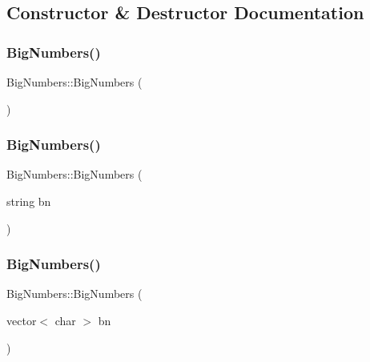\subsection{Constructor \& Destructor Documentation}
\mbox{\label{class_big_numbers_af3dd82883f10f3473ac83280f26b0ad8}} 
\subsubsection{\texorpdfstring{Big\+Numbers()}{BigNumbers()}\hspace{0.1cm}{\footnotesize\ttfamily [1/3]}}
{\footnotesize\ttfamily Big\+Numbers\+::\+Big\+Numbers (\begin{DoxyParamCaption}{ }\end{DoxyParamCaption})}

\mbox{\label{class_big_numbers_a99d3e27e38581f94c7c72a907ce83a98}} 
\subsubsection{\texorpdfstring{Big\+Numbers()}{BigNumbers()}\hspace{0.1cm}{\footnotesize\ttfamily [2/3]}}
{\footnotesize\ttfamily Big\+Numbers\+::\+Big\+Numbers (\begin{DoxyParamCaption}\item[{string}]{bn }\end{DoxyParamCaption})}

\mbox{\label{class_big_numbers_a472b5513193db24f582dc3ea5288f1a6}} 
\subsubsection{\texorpdfstring{Big\+Numbers()}{BigNumbers()}\hspace{0.1cm}{\footnotesize\ttfamily [3/3]}}
{\footnotesize\ttfamily Big\+Numbers\+::\+Big\+Numbers (\begin{DoxyParamCaption}\item[{vector$<$ char $>$}]{bn }\end{DoxyParamCaption})}



